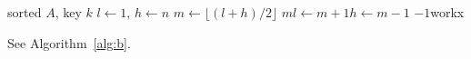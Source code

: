 \documentclass{article}
\begin{document}
\begin{algorithm}\caption{Binary search}\label{alg:b}
\begin{algorithmic}[1]\Require sorted $A$, key $k$
\State $l\gets 1$, $h\gets n$
\State $m\gets\lfloor(l+h)/2\rfloor$
\State \Return $m$\State $l\gets m+1$\Else\State $h\gets m-1$\EndIf
\EndWhile\State \Return $-1$\EndProcedure{}\State work\EndFor\Repeat\State x
\end{algorithmic}\end{algorithm}
See Algorithm~\ref{alg:b}.
\end{document}
